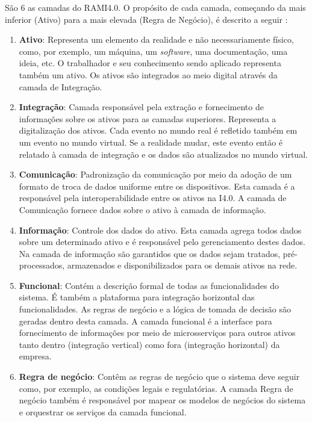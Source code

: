 	São 6 as camadas do RAMI4.0. O propósito de cada camada, começando da mais inferior (Ativo) para a mais elevada (Regra de Negócio), é descrito a seguir \cite{bitkom2016implementation}:
	
	\begin{enumerate}
		\item \textbf{Ativo}: Representa um elemento da realidade e não necessariamente físico, como, por exemplo, um máquina, um \textit{software}, uma documentação, uma ideia, etc. O trabalhador e seu conhecimento sendo aplicado representa também um ativo. Os ativos são integrados ao meio digital através da camada de Integração.
		
		\item \textbf{Integração}: Camada responsável pela extração e fornecimento de informações sobre os ativos para as camadas superiores. Representa a digitalização dos ativos. Cada evento no mundo real é refletido também em um evento no mundo virtual. Se a realidade mudar, este evento então é relatado à camada de integração e os dados são atualizados no mundo virtual.
		
		\item \textbf{Comunicação}: Padronização da comunicação por meio da adoção de um formato de troca de dados uniforme entre os dispositivos. Esta camada é a responsável pela interoperabilidade entre os ativos na I4.0. A camada de Comunicação fornece dados sobre o ativo à camada de informação.
		
		\item \textbf{Informação}: Controle dos dados do ativo. Esta camada agrega todos dados sobre um determinado ativo e é responsável pelo gerenciamento destes dados. Na camada de informação são garantidos que os dados sejam tratados, pré-processados, armazenados e disponibilizados para os demais ativos na rede.
		
		\item \textbf{Funcional}: Contém a descrição formal de todas as funcionalidades do sistema. É também a plataforma para integração horizontal das funcionalidades. As regras de negócio e a lógica de tomada de decisão são geradas dentro desta camada. A camada funcional é a interface para fornecimento de informações por meio de microsserviços para outros ativos tanto dentro (integração vertical) como fora (integração horizontal) da empresa.
			
		\item \textbf{Regra de negócio}: Contêm as regras de negócio que o sistema deve seguir como, por exemplo, as condições legais e regulatórias. A camada Regra de negócio também é responsável por mapear os modelos de negócios do sistema e orquestrar os serviços da camada funcional.
	\end{enumerate}

